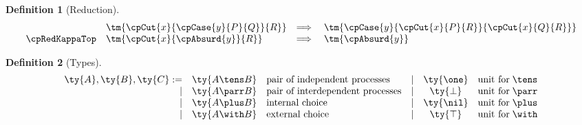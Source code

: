 \documentclass[submission,copyright,creativecommons]{eptcs}
\newtheorem{definition}{Definition}
\begin{document}
\begin{definition}[Reduction]
\begin{gather*}
\begin{array}{llcll}
      & \tm{\cpCut{x}{\cpCase{y}{P}{Q}}{R}}
      & \Longrightarrow \;
      & \tm{\cpCase{y}{\cpCut{x}{P}{R}}{\cpCut{x}{Q}{R}}}
      \\
      \cpRedKappaTop
      & \tm{\cpCut{x}{\cpAbsurd{y}}{R}}
      & \Longrightarrow \;
      & \tm{\cpAbsurd{y}}
    \end{array}
  \end{gather*}
  \begin{center}
    \begin{prooftree*}
      \SYM{\cpRedGammaCut}
    \end{prooftree*}
    \begin{prooftree*}
      \SYM{\cpRedGammaEquiv}
    \end{prooftree*}
  \end{center}
\end{definition}

\begin{definition}[Types]\label{def:cp-types}
  \begin{gather*}
    \begin{array}{rclrcl}
      \ty{A}, \ty{B}, \ty{C}
           :=& \ty{A \tens B} &\text{pair of independent processes}
      &  \mid& \ty{\one}      &\text{unit for} \; {\tens}
      \\ \mid& \ty{A \parr B} &\text{pair of interdependent processes}
      &  \mid& \ty{\bot}      &\text{unit for} \; {\parr}
      \\ \mid& \ty{A \plus B} &\text{internal choice}
      &  \mid& \ty{\nil}      &\text{unit for} \; {\plus}
      \\ \mid& \ty{A \with B} &\text{external choice}
      &  \mid& \ty{\top}      &\text{unit for} \; {\with}
    \end{array}
  \end{gather*}
\end{definition}
\end{document}
